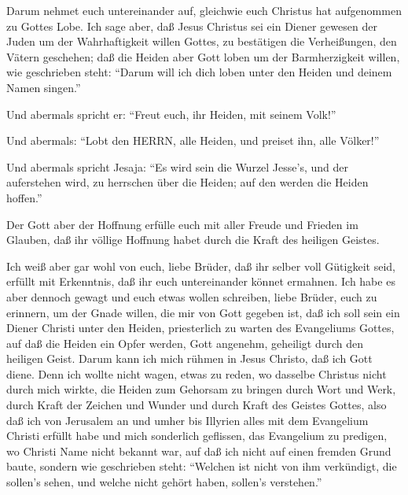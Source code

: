  Darum nehmet euch untereinander auf, gleichwie euch
Christus hat aufgenommen zu Gottes Lobe.  Ich sage aber, daß
Jesus Christus sei ein Diener gewesen der Juden um der Wahrhaftigkeit
willen Gottes, zu bestätigen die Verheißungen, den Vätern geschehen;
 daß die Heiden aber Gott loben um der Barmherzigkeit
willen, wie geschrieben steht: ``Darum will ich dich loben unter den
Heiden und deinem Namen singen.''

 Und abermals spricht er: ``Freut euch, ihr Heiden, mit
seinem Volk!''

 Und abermals: ``Lobt den HERRN, alle Heiden, und preiset
ihn, alle Völker!''

 Und abermals spricht Jesaja: ``Es wird sein die Wurzel
Jesse's, und der auferstehen wird, zu herrschen über die Heiden; auf den
werden die Heiden hoffen.''

 Der Gott aber der Hoffnung erfülle euch mit aller Freude
und Frieden im Glauben, daß ihr völlige Hoffnung habet durch die Kraft
des heiligen Geistes.

 Ich weiß aber gar wohl von euch, liebe Brüder, daß ihr
selber voll Gütigkeit seid, erfüllt mit Erkenntnis, daß ihr euch
untereinander könnet ermahnen.  Ich habe es aber dennoch
gewagt und euch etwas wollen schreiben, liebe Brüder, euch zu erinnern,
um der Gnade willen, die mir von Gott gegeben ist,  daß ich
soll sein ein Diener Christi unter den Heiden, priesterlich zu warten
des Evangeliums Gottes, auf daß die Heiden ein Opfer werden, Gott
angenehm, geheiligt durch den heiligen Geist.  Darum kann
ich mich rühmen in Jesus Christo, daß ich Gott diene.  Denn
ich wollte nicht wagen, etwas zu reden, wo dasselbe Christus nicht durch
mich wirkte, die Heiden zum Gehorsam zu bringen durch Wort und Werk,
 durch Kraft der Zeichen und Wunder und durch Kraft des
Geistes Gottes, also daß ich von Jerusalem an und umher bis Illyrien
alles mit dem Evangelium Christi erfüllt habe  und mich
sonderlich geflissen, das Evangelium zu predigen, wo Christi Name nicht
bekannt war, auf daß ich nicht auf einen fremden Grund baute,
 sondern wie geschrieben steht: ``Welchen ist nicht von ihm
verkündigt, die sollen's sehen, und welche nicht gehört haben, sollen's
verstehen.''

